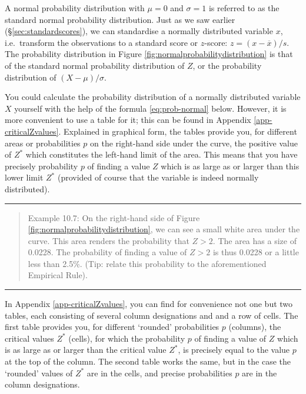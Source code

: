 \documentclass[
]{book}
\begin{document}
A normal probability distribution with \(\mu=0\) and \(\sigma=1\) is referred to as
the standard normal probability distribution. Just as we saw earlier
(§\ref{sec:standardscores}), we can standardise a normally distributed
variable \(x\), i.e.~transform the observations to a standard score
or \(z\)-score: \(z = (x-\overline{x})/s\).
The probability distribution in
Figure \ref{fig:normalprobabilitydistribution} is that of the standard normal
probability distribution of \(Z\), or the probability distribution of \((X-\mu)/\sigma\).

You could calculate the probability distribution of a normally distributed
variable \(X\) yourself with the help of the formula
\eqref{eq:prob-normal} below. However, it is more convenient to
use a table for it; this can be found in
Appendix \ref{app-criticalZvalues}.
Explained in graphical form, the tables provide you, for
different areas or probabilities \(p\) on the right-hand side under the curve,
the positive value of \(Z^*\) which constitutes the left-hand limit of the area.
This means that you have precisely probability \(p\) of finding
a value \(Z\) which is as large as or larger than this lower limit \(Z^*\)
(provided of course that the variable is indeed normally distributed).

\begin{center}\rule{0.5\linewidth}{0.5pt}\end{center}

\begin{quote}
Example 10.7: On the right-hand side of Figure
\ref{fig:normalprobabilitydistribution}, we can see a small white area
under the curve. This area renders the probability that
\(Z>2\). The area has a size of 0.0228. The probability of finding a value of \(Z>2\) is thus 0.0228 or a little less than 2.5\%. (Tip: relate this
probability to the aforementioned Empirical Rule).
\end{quote}

\begin{center}\rule{0.5\linewidth}{0.5pt}\end{center}

In Appendix \ref{app-criticalZvalues}, you can find for convenience not one but two
tables, each consisting of several column designations and
and a row of cells. The first table provides you, for different `rounded'
probabilities \(p\) (columns), the critical values \(Z^*\) (cells), for which the
probability \(p\) of finding a value of \(Z\) which is as large as or larger
than the critical value \(Z^*\), is precisely equal to the value \(p\)
at the top of the column. The second table works the same, but in the case the
`rounded' values of \(Z^*\) are in the cells, and precise probabilities \(p\) are in the
column designations.
\end{document}
